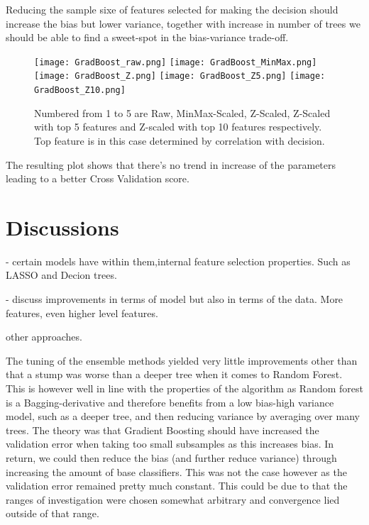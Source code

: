 \documentclass{article}
\begin{document}
    Reducing the sample sixe of features selected for making the decision should increase the bias but lower variance, together with increase in number of trees we should be able to find a sweet-spot in the bias-variance trade-off.
        
    \begin{figure}[ht!]
        \texttt{[image: GradBoost\_raw.png]}\hfill
        \texttt{[image: GradBoost\_MinMax.png]}\hfill
        \texttt{[image: GradBoost\_Z.png]}\hfill
        \texttt{[image: GradBoost\_Z5.png]}\hfill
        \texttt{[image: GradBoost\_Z10.png]}\hfill

        \caption{Numbered from 1 to 5 are Raw, MinMax-Scaled, Z-Scaled, Z-Scaled with top 5 features and Z-scaled with top 10 features respectively. Top feature is in this case determined by correlation with decision.}
        \label{fig:randfor}
    \end{figure}
        
    The resulting plot shows that there's no trend in increase of the parameters leading to a better Cross Validation score.
      
      
    \section{Discussions}
    
    - certain models have within them,internal feature selection properties. Such as LASSO and Decion trees. 
    
    - discuss improvements in terms of model but also in terms of the data. More features, even higher level features. 
    
    other approaches. 
    
    The tuning of the ensemble methods yielded very little improvements other than that a stump was worse than a deeper tree when it comes to Random Forest. This is however well in line with the properties of the algorithm as Random forest is a Bagging-derivative and therefore benefits from a low bias-high variance model, such as a deeper tree, and then reducing variance by averaging over many trees. The theory was that Gradient Boosting should have increased the validation error when taking too small subsamples as this increases bias. In return, we could then reduce the bias (and further reduce variance) through increasing the amount of base classifiers. This was not the case however as the validation error remained pretty much constant. This could be due to that the ranges of investigation were chosen somewhat arbitrary and convergence lied outside of that range.
    
\end{document}
